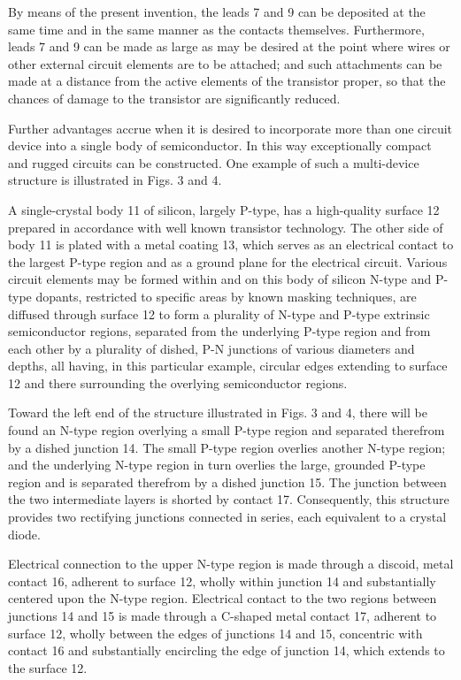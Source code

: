 By means of the present invention, the leads 7 and 9 can be deposited at the same time and in the same manner as the contacts themselves. Furthermore, leads 7 and 9 can be made as large as may be desired at the point where wires or other external circuit elements are to be attached; and such attachments can be made at a distance from the active elements of the transistor proper, so that the chances of damage to the transistor are significantly reduced.

Further advantages accrue when it is desired to incorporate more than one circuit device into a single body of semiconductor. In this way exceptionally compact and rugged circuits can be constructed. One example of such a multi-device structure is illustrated in Figs. 3 and 4.

A single-crystal body 11 of silicon, largely P-type, has a high-quality surface 12 prepared in accordance with well known transistor technology. The other side of body 11 is plated with a metal coating 13, which serves as an electrical contact to the largest P-type region and as a ground plane for the electrical circuit. Various circuit elements may be formed within and on this body of silicon N-type and P-type dopants, restricted to specific areas by known masking techniques, are diffused through surface 12 to form a plurality of N-type and P-type extrinsic semiconductor regions, separated from the underlying P-type region and from each other by a plurality of dished, P-N junctions of various diameters and depths, all having, in this particular example, circular edges extending to surface 12 and there surrounding the overlying semiconductor regions.

Toward the left end of the structure illustrated in Figs. 3 and 4, there will be found an N-type region overlying a small P-type region and separated therefrom by a dished junction 14. The small P-type region overlies another N-type region; and the underlying N-type region in turn overlies the large, grounded P-type region and is separated therefrom by a dished junction 15. The junction between the two intermediate layers is shorted by contact 17. Consequently, this structure provides two rectifying junctions connected in series, each equivalent to a crystal diode.

Electrical connection to the upper N-type region is made through a discoid, metal contact 16, adherent to surface 12, wholly within junction 14 and substantially centered upon the N-type region. Electrical contact to the two regions between junctions 14 and 15 is made through a C-shaped metal contact 17, adherent to surface 12, wholly between the edges of junctions 14 and 15, concentric with contact 16 and substantially encircling the edge of junction 14, which extends to the surface 12.

